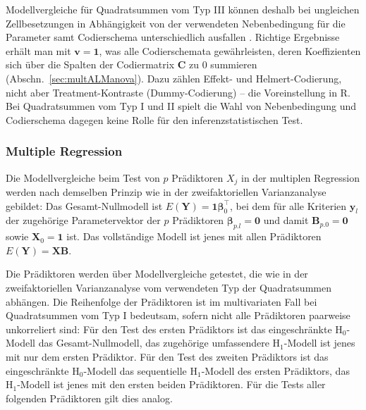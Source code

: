 Modellvergleiche für Quadratsummen vom Typ III können deshalb bei ungleichen Zellbesetzungen in Abhängigkeit von der verwendeten Nebenbedingung für die Parameter samt Codierschema unterschiedlich ausfallen \cite{Venables2016}. Richtige Ergebnisse erhält man mit $\bm{v} = \bm{1}$, was alle Codierschemata gewährleisten, deren Koeffizienten sich über die Spalten der Codiermatrix $\bm{C}$ zu $0$ summieren (Abschn.\ \ref{sec:multALManova}). Dazu zählen Effekt- und Helmert-Codierung, nicht aber Treatment-Kontraste (Dummy-Codierung) -- die Voreinstellung in R. Bei Quadratsummen vom Typ I und II spielt die Wahl von Nebenbedingung und Codierschema dagegen keine Rolle für den inferenzstatistischen Test.

\subsubsection{Multiple Regression}

Die Modellvergleiche beim Test von $p$ Prädiktoren $X_{j}$ in der multiplen Regression werden nach demselben Prinzip wie in der zweifaktoriellen Varianzanalyse gebildet: Das Gesamt-Nullmodell ist $E(\bm{Y}) = \bm{1} \bm{\beta}_{0}^{\top}$, bei dem für alle Kriterien $\bm{y}_{l}$ der zugehörige Parametervektor der $p$ Prädiktoren $\bm{\beta}_{p.l} = \bm{0}$ und damit $\bm{B}_{p.0} = \bm{0}$ sowie $\bm{X}_{0} = \bm{1}$ ist. Das vollständige Modell ist jenes mit allen Prädiktoren $E(\bm{Y}) = \bm{X} \bm{B}$.

Die Prädiktoren werden über Modellvergleiche getestet, die wie in der zweifaktoriellen Varianzanalyse vom verwendeten Typ der Quadratsummen abhängen. Die Reihenfolge der Prädiktoren ist im multivariaten Fall bei Quadratsummen vom Typ I bedeutsam, sofern nicht alle Prädiktoren paarweise unkorreliert sind: Für den Test des ersten Prädiktors ist das eingeschränkte $\text{H}_{0}$-Modell das Gesamt-Nullmodell, das zugehörige umfassendere $\text{H}_{1}$-Modell ist jenes mit nur dem ersten Prädiktor. Für den Test des zweiten Prädiktors ist das eingeschränkte $\text{H}_{0}$-Modell das sequentielle $\text{H}_{1}$-Modell des ersten Prädiktors, das $\text{H}_{1}$-Modell ist jenes mit den ersten beiden Prädiktoren. Für die Tests aller folgenden Prädiktoren gilt dies analog.

